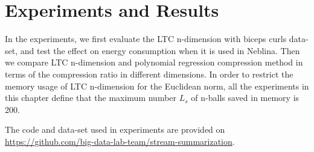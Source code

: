 \chapter{Experiments and Results}
\label{chap:expsAndResults}
In the experiments, we first evaluate the LTC n-dimension with biceps curls
data-set, and test the effect on energy consumption when it is used in Neblina.
Then we compare LTC n-dimension and polynomial regression compression method in
terms of the compression ratio in different dimensions. In order to restrict the
memory usage of LTC n-dimension for the Euclidean norm, all the experiments in
this chapter define that the maximum number $L_s$ of n-balls saved in memory is
200.

The code and data-set used in experiments are provided on
\url{https://github.com/big-data-lab-team/stream-summarization}. 





